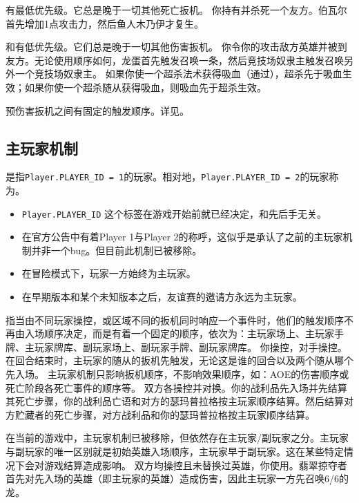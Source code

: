 有最低优先级。它总是晚于一切其他死亡扳机。
\example 你持有并杀死一个友方。伯瓦尔首先增加1点攻击力，然后鱼人木乃伊才复生。

和有低优先级。它们总是晚于一切其他伤害扳机。
\example 你令你的攻击敌方英雄并被到友方。无论使用顺序如何，龙蛋首先触发召唤一条，然后竞技场奴隶主触发召唤另外一个竞技场奴隶主。
\notice 如果你使一个超杀法术获得吸血（通过），超杀先于吸血生效；如果你使一个超杀随从获得吸血，则吸血先于超杀生效。

预伤害扳机之间有固定的触发顺序。详见。

\subsection{主玩家机制}

是指\texttt{Player.PLAYER\_ID = 1}的玩家。相对地，\texttt{Player.PLAYER\_ID = 2}的玩家称为。
\begin{itemize}
    \item \texttt{Player.PLAYER\_ID} 这个标签在游戏开始前就已经决定，和先后手无关。
    \item 在官方公告中有着Player 1与Player 2的称呼，这似乎是承认了之前的主玩家机制并非一个bug。但目前此机制已被移除。
    \item 在冒险模式下，玩家一方始终为主玩家。
    \item 在早期版本和某个未知版本之后，友谊赛的邀请方永远为主玩家。
\end{itemize}

指当由不同玩家操控，或区域不同的扳机同时响应一个事件时，他们的触发顺序不再由入场顺序决定，而是有着一个固定的顺序，依次为：主玩家场上、主玩家手牌、主玩家牌库、副玩家场上、副玩家手牌、副玩家牌库。
\example 你操控，对手操控。在回合结束时，主玩家的随从的扳机先触发，无论这是谁的回合以及两个随从哪个先入场。
\notice 主玩家机制只影响扳机顺序，不影响效果顺序，如：AOE的伤害顺序或死亡阶段各死亡事件的顺序等。
\example 双方各操控并对换。你的战利品先入场并先结算其死亡步骤，你的战利品亡语和对方的瑟玛普拉格按主玩家顺序结算。然后结算对方贮藏者的死亡步骤，对方战利品和你的瑟玛普拉格按主玩家顺序结算。

在当前的游戏中，主玩家机制已被移除，但依然存在主玩家/副玩家之分。主玩家与副玩家的唯一区别就是初始英雄入场顺序，主玩家早于副玩家。这在某些特定情况下会对游戏结算造成影响。
\example 双方均操控且未替换过英雄，你使用。翡翠掠夺者首先对先入场的英雄（即主玩家的英雄）造成伤害，因此主玩家一方先召唤6/6的龙。

